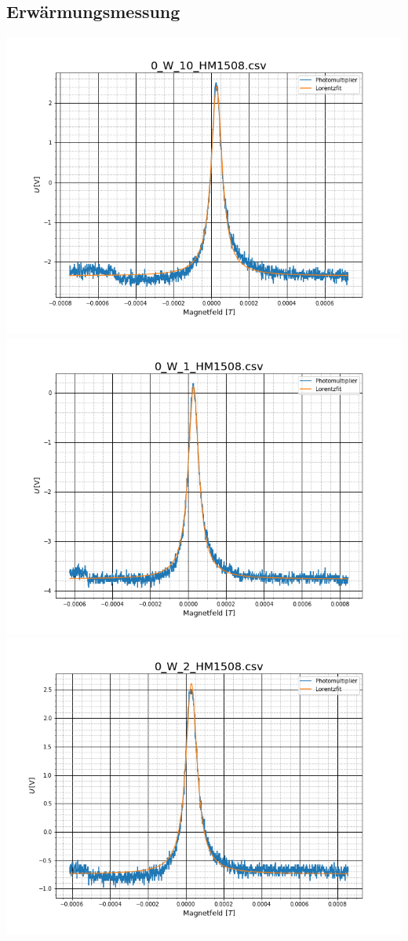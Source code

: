 \subsection{Erwärmungsmessung}
\includegraphics[scale=0.3]{Bild/Anhang/Erwarmung/erw1}
\includegraphics[scale=0.3]{Bild/Anhang/Erwarmung/erw2}\\
\includegraphics[scale=0.3]{Bild/Anhang/Erwarmung/erw3}
